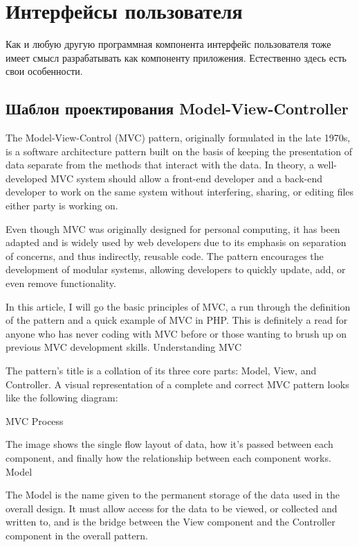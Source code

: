 \documentclass[a4paper,openany,twoside,final]{book}
\begin{document}
\chapter{Интерфейсы пользователя}

Как и любую другую программная компонента интерфейс пользователя тоже имеет смысл разрабатывать как компоненту приложения.  Естественно здесь есть свои особенности.

\section{Шаблон проектирования Model-View-Controller}
\label{sec:MVC}

The Model-View-Control (MVC) pattern, originally formulated in the late 1970s, is a software architecture pattern built on the basis of keeping the presentation of data separate from the methods that interact with the data. In theory, a well-developed MVC system should allow a front-end developer and a back-end developer to work on the same system without interfering, sharing, or editing files either party is working on.

Even though MVC was originally designed for personal computing, it has been adapted and is widely used by web developers due to its emphasis on separation of concerns, and thus indirectly, reusable code. The pattern encourages the development of modular systems, allowing developers to quickly update, add, or even remove functionality.

In this article, I will go the basic principles of MVC, a run through the definition of the pattern and a quick example of MVC in PHP. This is definitely a read for anyone who has never coding with MVC before or those wanting to brush up on previous MVC development skills.
Understanding MVC

The pattern’s title is a collation of its three core parts: Model, View, and Controller. A visual representation of a complete and correct MVC pattern looks like the following diagram:

MVC Process

The image shows the single flow layout of data, how it’s passed between each component, and finally how the relationship between each component works.
Model

The Model is the name given to the permanent storage of the data used in the overall design. It must allow access for the data to be viewed, or collected and written to, and is the bridge between the View component and the Controller component in the overall pattern.
\end{document}
